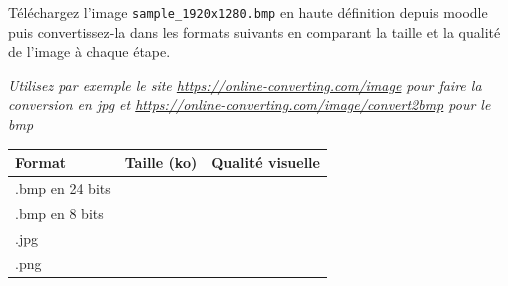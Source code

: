 \documentclass[11pt, a4paper]{book}
\begin{document}
\begin{exercice}
Téléchargez l'image \texttt{sample\_1920x1280.bmp} en haute définition depuis moodle puis convertissez-la dans les formats suivants en comparant la taille et la qualité de l'image à chaque étape. 

\textit{Utilisez par exemple le site \url{https://online-converting.com/image} pour faire la conversion en jpg et \url{https://online-converting.com/image/convert2bmp} pour le bmp}
\begin{center}
   \begin{tabular}{| l || c | r | }
     \hline
     Format & Taille (ko) & Qualité visuelle \\ \hline
     .bmp en 24 bits &  &  \\ \hline
     .bmp en 8 bits &  &  \\ \hline
     .jpg &  &  \\ \hline
     .png &  &  \\
     \hline
   \end{tabular}
\end{center}
\end{exercice}
\end{document}

